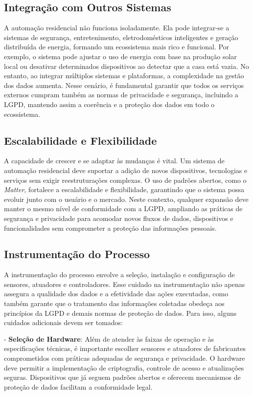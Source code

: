 \subsection{Integração com Outros Sistemas}

A automação residencial não funciona isoladamente. Ela pode integrar-se a sistemas de segurança, entretenimento, eletrodomésticos inteligentes e geração distribuída de energia, formando um ecossistema mais rico e funcional. Por exemplo, o sistema pode ajustar o uso de energia com base na produção solar local ou desativar determinados dispositivos ao detectar que a casa está vazia. No entanto, ao integrar múltiplos sistemas e plataformas, a complexidade na gestão dos dados aumenta. Nesse cenário, é fundamental garantir que todos os serviços externos cumpram também as normas de privacidade e segurança, incluindo a LGPD, mantendo assim a coerência e a proteção dos dados em todo o ecossistema.

\subsection{Escalabilidade e Flexibilidade}

A capacidade de crescer e se adaptar às mudanças é vital. Um sistema de automação residencial deve suportar a adição de novos dispositivos, tecnologias e serviços sem exigir reestruturações complexas. O uso de padrões abertos, como o \textit{Matter}, fortalece a escalabilidade e flexibilidade, garantindo que o sistema possa evoluir junto com o usuário e o mercado. Neste contexto, qualquer expansão deve manter o mesmo nível de conformidade com a LGPD, ampliando as práticas de segurança e privacidade para acomodar novos fluxos de dados, dispositivos e funcionalidades sem comprometer a proteção das informações pessoais.

\subsection{Instrumentação do Processo}

A instrumentação do processo envolve a seleção, instalação e configuração de sensores, atuadores e controladores. Esse cuidado na instrumentação não apenas assegura a qualidade dos dados e a efetividade das ações executadas, como também garante que o tratamento das informações coletadas obedeça aos princípios da LGPD e demais normas de proteção de dados. Para isso, alguns cuidados adicionais devem ser tomados:

- \textbf{Seleção de Hardware}: Além de atender às faixas de operação e às especificações técnicas, é importante escolher sensores e atuadores de fabricantes comprometidos com práticas adequadas de segurança e privacidade. O hardware deve permitir a implementação de criptografia, controle de acesso e atualizações seguras. Dispositivos que já seguem padrões abertos e oferecem mecanismos de proteção de dados facilitam a conformidade legal.

